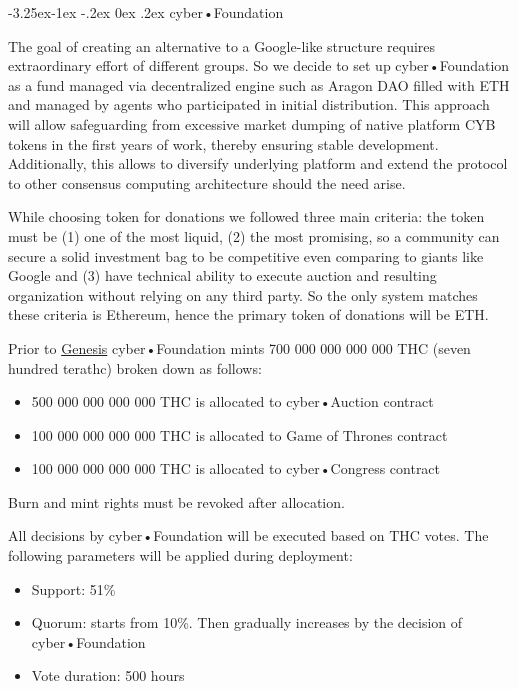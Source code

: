 \documentclass[8pt,oneside]{amsart}
\makeatletter
\renewcommand\subsection{\@startsection{subsection}{2}{\z@}%
                                     {-3.25ex\@plus -1ex \@minus -.2ex}%
                                     {0ex \@plus .2ex}%
                                     {\play\Large}}%
\newcommand{\titleSection}[1]{\subsection{#1}}
\newenvironment{Figure}
  {\par\medskip\noindent\minipage{\linewidth}}
  {\endminipage\par\medskip}
\makeatother
\begin{document}
\titleSection{cyber•Foundation}\label{joint-goal}

The goal of creating an alternative to a Google-like structure requires extraordinary effort of different groups. So we decide to set up cyber•Foundation as a fund managed via decentralized engine such as Aragon DAO filled with ETH and managed by agents who participated in initial distribution. This approach will allow safeguarding from excessive market dumping of native platform CYB tokens in the first years of work, thereby ensuring stable development. Additionally, this allows to diversify underlying platform and extend the protocol to other consensus computing architecture should the need arise.

While choosing token for donations we followed three main criteria: the token must be (1) one of the most liquid, (2) the most promising, so a community can secure a solid investment bag to be competitive even comparing to giants like Google and (3) have technical ability to execute auction and resulting organization without relying on any third party. So the only system matches these criteria is Ethereum, hence the primary token of donations will be ETH.

Prior to \hyperlink{genesis}{Genesis} cyber•Foundation mints 700 000 000 000 000 THC (seven hundred terathc) broken down as follows:

\begin{itemize}
\item 500 000 000 000 000 THC is allocated to cyber•Auction contract
\item 100 000 000 000 000 THC is allocated to Game of Thrones contract
\item 100 000 000 000 000 THC is allocated to cyber•Congress contract
\end{itemize}

\begin{Figure}
 \centering
 
\end{Figure}

Burn and mint rights must be revoked after allocation.

All decisions by cyber•Foundation will be executed based on THC votes. The following parameters will be applied during deployment:

\begin{itemize}
\item Support: 51\%
\item Quorum: starts from 10\%. Then gradually increases by the decision of cyber•Foundation
\item Vote duration: 500 hours
\end{itemize}
\end{document}

